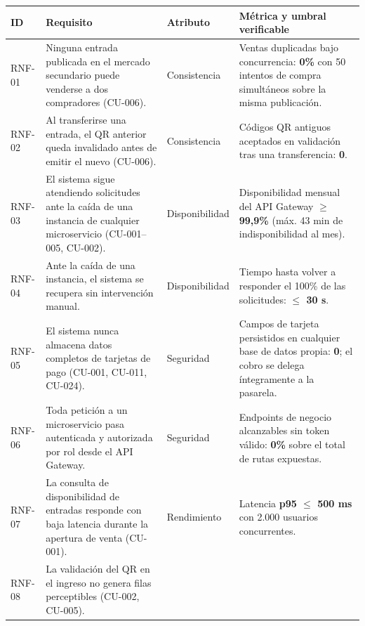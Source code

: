 
\begin{center}
\begin{longtable}{p{1.3cm}p{5.2cm}p{2.4cm}p{5.4cm}}
\toprule
\textbf{ID} & \textbf{Requisito} & \textbf{Atributo} & \textbf{Métrica y umbral verificable}\\
\midrule
\endhead
RNF-01 & Ninguna entrada publicada en el mercado secundario puede venderse a dos compradores
(CU-006). & Consistencia & Ventas duplicadas bajo concurrencia: \textbf{0\%} con 50 intentos de
compra simultáneos sobre la misma publicación.\\[0.3em]
RNF-02 & Al transferirse una entrada, el QR anterior queda invalidado antes de emitir el nuevo
(CU-006). & Consistencia & Códigos QR antiguos aceptados en validación tras una transferencia:
\textbf{0}.\\[0.3em]
RNF-03 & El sistema sigue atendiendo solicitudes ante la caída de una instancia de cualquier
microservicio (CU-001--005, CU-002). & Disponibilidad & Disponibilidad mensual del API Gateway
\textbf{$\geq$ 99,9\%} (máx. 43 min de indisponibilidad al mes).\\[0.3em]
RNF-04 & Ante la caída de una instancia, el sistema se recupera sin intervención manual.
& Disponibilidad & Tiempo hasta volver a responder el 100\% de las solicitudes:
\textbf{$\leq$ 30 s}.\\[0.3em]
RNF-05 & El sistema nunca almacena datos completos de tarjetas de pago (CU-001, CU-011, CU-024).
& Seguridad & Campos de tarjeta persistidos en cualquier base de datos propia: \textbf{0}; el
cobro se delega íntegramente a la pasarela.\\[0.3em]
RNF-06 & Toda petición a un microservicio pasa autenticada y autorizada por rol desde el API
Gateway. & Seguridad & Endpoints de negocio alcanzables sin token válido: \textbf{0\%} sobre el
total de rutas expuestas.\\[0.3em]
RNF-07 & La consulta de disponibilidad de entradas responde con baja latencia durante la apertura
de venta (CU-001). & Rendimiento & Latencia \textbf{p95 $\leq$ 500 ms} con 2.000 usuarios
concurrentes.\\[0.3em]
RNF-08 & La validación del QR en el ingreso no genera filas perceptibles (CU-002, CU-005).

\end{longtable}
\end{center}
